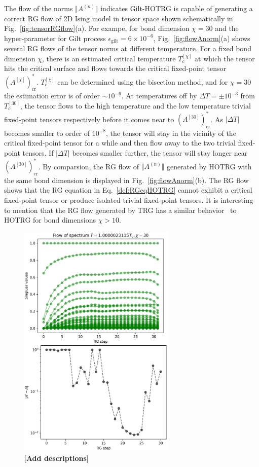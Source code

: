 \documentclass[aps,prb,reprint,superscriptaddress]{revtex4-2}
\begin{document}
The flow of the norms $\Vert A^{(n)} \Vert$ indicates Gilt-HOTRG is
capable of generating a correct RG flow of 2D Ising model in tensor
space shown schematically in Fig.~\ref{fig:tensorRGflow}(a). For exampe,
for bond dimension $\chi = 30$ and the hyper-parameter for Gilt process
$\epsilon_{\text{gilt}} = 6\times 10^{-6}$, Fig.~\ref{fig:flowAnorm}(a)
shows several RG flows of the tensor norms at different temperature. For
a fixed bond dimension $\chi$, there is an estimated critical
temperature $T_c^{[\chi]}$ at which the tensor
hits the critical surface and flows towards the critical fixed-point
tensor $(A^{[\chi]})^*_{\text{cr}}$. $T_c^{[\chi]}$ can be determined
using the bisection method, and for $\chi = 30$ the estimation error is
of order $\sim 10^{-6}$. At temperatures off by $\Delta T = \pm 10^{-3}$
from $T_c^{[30]}$, the tensor flows to the high temperature and the
low temperature trivial fixed-point tensors respectively before it comes
near to $(A^{[30]})^*_{\text{cr}}$. As $|\Delta T|$ becomes smaller to
order of $10^{-8}$, the tensor will stay in the vicinity of the critical
fixed-point tensor for a while and then flow away to the two trivial
fixed-point tensors. If $|\Delta T|$ becomes smaller further, the tensor
will stay longer near $(A^{[30]})^*_{\text{cr}}$. By comparsion, the
RG flow of $\Vert A^{(n)}\Vert$ generated by HOTRG with the same bond
dimension is displayed in Fig.~\ref{fig:flowAnorm}(b). The RG flow shows
that the RG equation in Eq.~\eqref{def:RGeqHOTRG} cannot exhibit a
critical fixed-point tensor or produce isolated trivial fixed-point
tensors. It is interesting to mention that the RG flow generated by TRG
has a similar behavior~\cite{Berker2008} to HOTRG for bond dimensions
$\chi > 10$.
\begin{figure}[htb]
    \includegraphics[width=7.5cm]{./figs/flowA}
    \caption{\label{fig:flowA}[\textbf{Add descriptions}]}
\end{figure}
%
\end{document}
